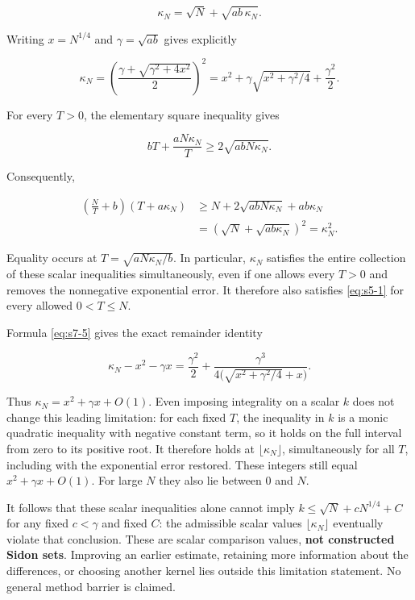 \documentclass[10pt]{article}
\numberwithin{equation}{section}
\theoremstyle{remark}
\begin{document}
\begin{equation}
\kappa_N=\sqrt N+\sqrt{ab\,\kappa_N}.
\label{eq:s7-4}
\end{equation}

Writing \(x=N^{1/4}\) and \(\gamma=\sqrt{ab}\) gives explicitly

\begin{equation}
\kappa_N
=\left(\frac{\gamma+\sqrt{\gamma^2+4x^2}}2\right)^2
=x^2+\gamma\sqrt{x^2+\gamma^2/4}+\frac{\gamma^2}{2}.
\label{eq:s7-5}
\end{equation}

For every \(T>0\), the elementary square inequality gives

\[
bT+\frac{aN\kappa_N}{T}\ge2\sqrt{abN\kappa_N}.
\]

Consequently,

\begin{equation}
\begin{aligned}
\left(\frac NT+b\right)(T+a\kappa_N)
&\ge N+2\sqrt{abN\kappa_N}+ab\kappa_N\\
&=\left(\sqrt N+\sqrt{ab\kappa_N}\right)^2
=\kappa_N^2.
\end{aligned}
\label{eq:s7-6}
\end{equation}

Equality occurs at \(T=\sqrt{aN\kappa_N/b}\). In particular,
\(\kappa_N\) satisfies the entire collection of these scalar
inequalities simultaneously, even if one allows every \(T>0\) and removes
the nonnegative exponential error. It therefore also satisfies \eqref{eq:s5-1} for
every allowed \(0<T\le N\).

Formula \eqref{eq:s7-5} gives the exact remainder identity

\begin{equation}
\kappa_N-x^2-\gamma x
=\frac{\gamma^2}{2}
+\frac{\gamma^3}{4\bigl(\sqrt{x^2+\gamma^2/4}+x\bigr)}.
\label{eq:s7-7}
\end{equation}

Thus \(\kappa_N=x^2+\gamma x+O(1)\). Even imposing integrality on a scalar
\(k\) does not change this leading limitation: for each fixed \(T\),
the inequality in \(k\) is a monic quadratic inequality with negative
constant term, so it holds on the full interval from zero to its positive
root. It therefore holds at \(\lfloor\kappa_N\rfloor\), simultaneously
for all \(T\), including with the exponential error restored. These
integers still equal \(x^2+\gamma x+O(1)\). For large \(N\) they also lie
between 0 and \(N\).

It follows that these scalar inequalities alone cannot imply
\(k\le\sqrt N+cN^{1/4}+C\) for any fixed \(c<\gamma\) and fixed \(C\):
the admissible scalar values \(\lfloor\kappa_N\rfloor\) eventually
violate that conclusion. These are scalar comparison values, \textbf{not
constructed Sidon sets}. Improving an earlier estimate, retaining more
information about the differences, or choosing another kernel lies outside
this limitation statement. No general method barrier is claimed.
\end{document}
